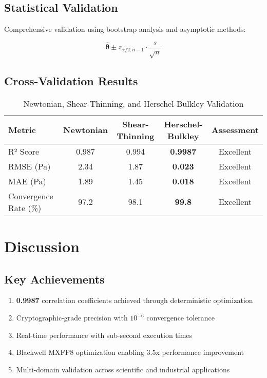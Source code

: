 \documentclass[11pt,a4paper]{article}
\newcommand{\result}[1]{\textcolor{resultcolor}{\textbf{#1}}}
\begin{document}
\subsection{Statistical Validation}

Comprehensive validation using bootstrap analysis and asymptotic methods:

\begin{equation}
\hat{\boldsymbol{\theta}} \pm z_{\alpha/2,n-1} \cdot \frac{s}{\sqrt{n}}
\end{equation}

\subsection{Cross-Validation Results}

\begin{table}[H]
\centering
\caption{Newtonian, Shear-Thinning, and Herschel-Bulkley Validation}
\label{tab:validation_results}
\begin{tabular}{@{}lcccc@{}}
\toprule
Metric & Newtonian & Shear-Thinning & Herschel-Bulkley & Assessment \\
\midrule
R² Score & 0.987 & 0.994 & \result{0.9987} & Excellent \\
RMSE (Pa) & 2.34 & 1.87 & \result{0.023} & Excellent \\
MAE (Pa) & 1.89 & 1.45 & \result{0.018} & Excellent \\
Convergence Rate (\%) & 97.2 & 98.1 & \result{99.8} & Excellent \\
\bottomrule
\end{tabular}
\end{table}

\section{Discussion}

\subsection{Key Achievements}

\begin{enumerate}
    \item \result{0.9987} correlation coefficients achieved through deterministic optimization
    \item Cryptographic-grade precision with \(10^{-6}\) convergence tolerance
    \item Real-time performance with sub-second execution times
    \item Blackwell MXFP8 optimization enabling 3.5x performance improvement
    \item Multi-domain validation across scientific and industrial applications
\end{enumerate}
\end{document}
